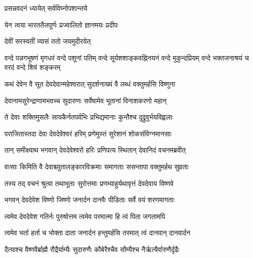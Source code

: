 \label{sec:start_ShivaSahasranamaStotram-VishnuKrtam}

{प्रसन्नवदनं ध्यायेत् सर्वविघ्नोपशान्तये}

{येन त्वया भारततैलपूर्णः प्रज्वालितो ज्ञानमयः प्रदीपः}%


{देवीं सरस्वतीं व्यासं ततो जयमुदीरयेत्}


{वन्दे पन्नगभूषणं मृगधरं वन्दे पशूनां पतिम्}
{वन्दे सूर्यशशाङ्कवह्निनयनं वन्दे मुकुन्दप्रियम्}
{वन्दे भक्तजनाश्रयं च वरदं वन्दे शिवं शङ्करम्}



\twolineshloka
{कथं देवेन वै सूत देवदेवान्महेश्वरात्}
{सुदर्शनाख्यं वै लब्धं वक्तुमर्हसि विष्णुना} %


\twolineshloka
{देवानामसुरेन्द्राणामभवच्च सुदारुणः}
{सर्वेषामेव भूतानां विनाशकरणो महान्} %

\twolineshloka
{ते देवाः शक्तिमुसलैः सायकैर्नतपर्वभिः}
{प्रभिद्यमानाः कुन्तैश्च दुद्रुवुर्भयविह्वलाः} %

\twolineshloka
{पराजितास्तदा देवा देवदेवेश्वरं हरिम्}
{प्रणेमुस्तं सुरेशानं शोकसंविग्नमानसाः} %

\twolineshloka
{तान् समीक्ष्याथ भगवान् देवदेवेश्वरो हरिः}
{प्रणिपत्य स्थितान् देवानिदं वचनमब्रवीत्} %

\twolineshloka
{वत्साः किमिति वै देवाश्च्युतालङ्कारविक्रमाः}
{समागताः ससन्तापा वक्तुमर्हथ सुव्रताः} %

\twolineshloka
{तस्य तद् वचनं श्रुत्वा तथाभूताः सुरोत्तमाः}
{प्रणम्याहुर्यथावृत्तं देवदेवाय विष्णवे} %

\twolineshloka
{भगवन् देवदेवेश विष्णो जिष्णो जनार्दन}
{दानवैः पीडिताः सर्वे वयं शरणमागताः} %

\twolineshloka
{त्वमेव देवदेवेश गतिर्नः पुरुषोत्तम}
{त्वमेव परमात्मा हि त्वं पिता जगतामपि} %

\twolineshloka
{त्वमेव भर्ता हर्ता च भोक्ता दाता जनार्दन}
{हन्तुमर्हसि तस्मात् त्वं दानवान् दानवार्दन} %

\twolineshloka
{दैत्याश्च वैष्णवैर्ब्राह्मै रौद्रैर्याम्यैः सुदारुणैः}
{कौबेरैश्चैव सौम्यैश्च नैर्ऋत्यैर्वारुणैर्दृढैः} %


